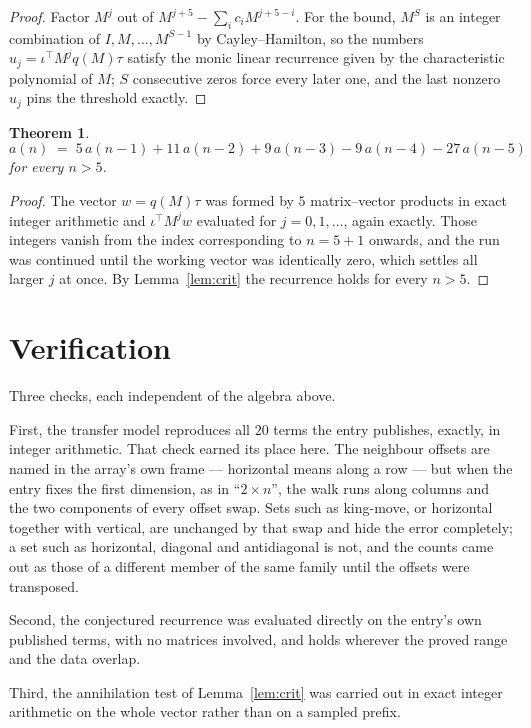 \documentclass[11pt,a4paper]{article}
\theoremstyle{plain}
\newtheorem{theorem}{Theorem}
\theoremstyle{definition}
\begin{document}
\begin{proof}
Factor $M^{j}$ out of $M^{j+5}-\sum_ic_iM^{j+5-i}$. For the bound, $M^{S}$
is an integer combination of $I,M,\dots,M^{S-1}$ by Cayley--Hamilton, so the numbers
$u_j=\iota^{\!\top}M^{j}q(M)\tau$ satisfy the monic linear recurrence given by the
characteristic polynomial of $M$; $S$ consecutive zeros force every later one, and the last
nonzero $u_j$ pins the threshold exactly.
\end{proof}

\begin{theorem}
\[
a(n)\;=\;5\,a(n-1) + 11\,a(n-2) + 9\,a(n-3) - 9\,a(n-4) - 27\,a(n-5)
\]
for every $n>5$.
\end{theorem}

\begin{proof}
The vector $w=q(M)\tau$ was formed by $5$ matrix--vector products in exact integer
arithmetic and $\iota^{\!\top}M^{j}w$ evaluated for $j=0,1,\dots$, again exactly. Those
integers vanish from the index corresponding to $n=5+1$ onwards, and the run was
continued until the working vector was identically zero, which settles all larger $j$ at once.
By Lemma~\ref{lem:crit} the recurrence holds for every $n>5$.
\end{proof}

\section{Verification}

Three checks, each independent of the algebra above.

First, the transfer model reproduces all $20$ terms the entry publishes, exactly, in
integer arithmetic. That check earned its place here. The neighbour offsets are named in the
array's own frame --- horizontal means along a row --- but when the entry fixes the first
dimension, as in ``$2\times n$'', the walk runs along columns and the two components of every
offset swap. Sets such as king-move, or horizontal together with vertical, are unchanged by
that swap and hide the error completely; a set such as horizontal, diagonal and antidiagonal
is not, and the counts came out as those of a different member of the same family until the
offsets were transposed.

Second, the conjectured recurrence was evaluated directly on the entry's own published terms,
with no matrices involved, and holds wherever the proved range and the data overlap.

Third, the annihilation test of Lemma~\ref{lem:crit} was carried out in exact integer
arithmetic on the whole vector rather than on a sampled prefix.
\end{document}
